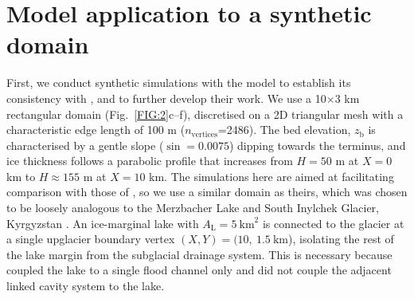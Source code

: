 \documentclass[tc, manuscript]{copernicus}
\begin{document}
\section{Model application to a synthetic domain}\label{application:synth}

First, we conduct synthetic simulations with the model to establish its consistency with \citet{kingslake2013modelling}, and to further develop their work. We use a 10$\times$3 km rectangular domain (Fig.~\ref{FIG:2}c--f), discretised on a 2D triangular mesh with a characteristic edge length of 100 m ($n_{\mathrm{vertices}}$=2486). The bed elevation, $z_{\mathrm{b}}$ is characterised by a gentle slope ($\sin=0.0075$) dipping towards the terminus, and ice thickness follows a parabolic profile that increases from $H=50$ m at $X=0$ km to $H\approx155$ m at $X = 10$ km. The simulations here are aimed at facilitating comparison with those of \citet{kingslake2013modelling}, so we use a similar domain as theirs, which was chosen to be loosely analogous to the Merzbacher Lake and South Inylchek Glacier, Kyrgyzstan \citep{ng2009temporal}. An ice-marginal lake with $A_{\mathrm{L}}=5\ \mathrm{km}^{2}$ is connected to the glacier at a single upglacier boundary vertex $(X, Y) = (10,\ 1.5\ \text{km}$), isolating the rest of the lake margin from the subglacial drainage system. This is necessary because \citet{kingslake2013modelling} coupled the lake to a single flood channel only and did not couple the adjacent linked cavity system to the lake. 
\end{document}

